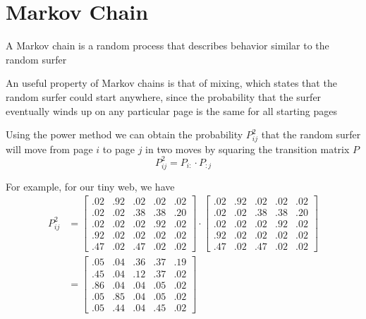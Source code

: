\documentclass[8pt,a4paper,compress]{beamer}
\begin{document}
\section{Markov Chain}
\begin{frame}[fragile]
\pause

A Markov chain is a random process that describes behavior similar to the random surfer

\pause
\bigskip

An useful property of Markov chains is that of mixing, which states that the random surfer could start anywhere, since the probability that the surfer eventually winds up on any particular page is the same for all starting pages

\pause
\bigskip

Using the power method we can obtain the probability $P^2_{ij}$ that the random surfer will move from page $i$ to page $j$ in two moves by squaring the transition matrix $P$ $$P^2_{ij} = P_{i:} \cdot P_{:j}$$ 

\pause
\bigskip

For example, for our tiny web, we have
\begin{align*}
P^2_{ij} &= 
\begin{bmatrix}
.02 & .92 & .02 & .02 & .02 \\
.02 & .02 & .38 & .38 & .20 \\
.02 & .02 & .02 & .92 & .02 \\
.92 & .02 & .02 & .02 & .02 \\
.47 & .02 & .47 & .02 & .02
\end{bmatrix}
\cdot
\begin{bmatrix}
.02 & .92 & .02 & .02 & .02 \\
.02 & .02 & .38 & .38 & .20 \\
.02 & .02 & .02 & .92 & .02 \\
.92 & .02 & .02 & .02 & .02 \\
.47 & .02 & .47 & .02 & .02
\end{bmatrix} \\
& =
\begin{bmatrix}
.05 & .04 & .36 & .37 & .19 \\
.45 & .04 & .12 & .37 & .02 \\
.86 & .04 & .04 & .05 & .02 \\
.05 & .85 & .04 & .05 & .02 \\
.05 & .44 & .04 & .45 & .02
\end{bmatrix} 
\end{align*}

\end{frame}
\end{document}
